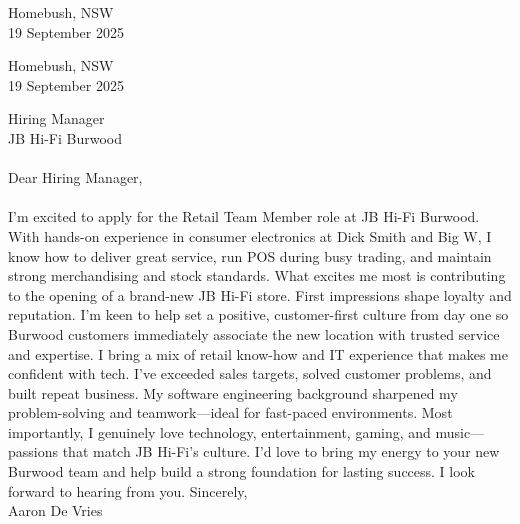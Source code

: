 \documentclass[a4paper,10pt]{article}
\begin{document}
\begin{flushright}
Homebush, NSW \\
19 September 2025
\end{flushright}
\ContactBlock

\begin{flushright}
Homebush, NSW \\
19 September 2025
\end{flushright}
Hiring Manager \\
JB Hi-Fi Burwood \\\\[0.6\baselineskip]
Dear Hiring Manager, \\\\[0.4\baselineskip]
I'm excited to apply for the Retail Team Member role at JB Hi-Fi Burwood. With hands-on experience in consumer electronics at Dick Smith and Big W, I know how to deliver great service, run POS during busy trading, and maintain strong merchandising and stock standards.
What excites me most is contributing to the opening of a brand-new JB Hi-Fi store. First impressions shape loyalty and reputation. I'm keen to help set a positive, customer-first culture from day one so Burwood customers immediately associate the new location with trusted service and expertise.
I bring a mix of retail know-how and IT experience that makes me confident with tech. I've exceeded sales targets, solved customer problems, and built repeat business. My software engineering background sharpened my problem-solving and teamwork—ideal for fast-paced environments.
Most importantly, I genuinely love technology, entertainment, gaming, and music—passions that match JB Hi-Fi's culture. I'd love to bring my energy to your new Burwood team and help build a strong foundation for lasting success.
I look forward to hearing from you.
\vspace{0.8\baselineskip}
Sincerely, \\
Aaron De Vries
\end{document}
